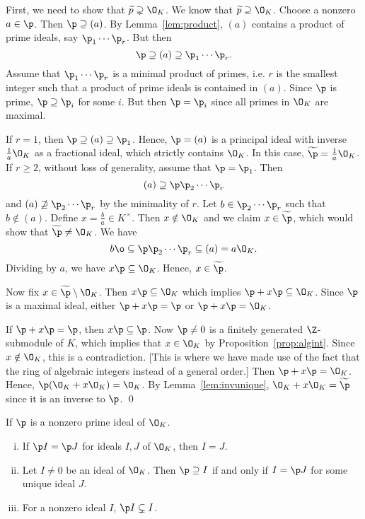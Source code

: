 \pf First, we need to show that $\widetilde{p} \supsetneq \O_K$. We know that $\widetilde{p} \supseteq \O_K$. Choose a nonzero $a \in \p$. Then $\p \supseteq (a)$. By Lemma~\ref{lem:product}, $(a)$ contains a product of prime ideals, say $\p_1\cdots\p_r$. But then
	\[
	\p \supseteq (a) \supseteq \p_1 \cdots \p_r.
	\]
Assume that $\p_1\cdots\p_r$ is a minimal product of primes, i.e. $r$ is the smallest integer such that a product of prime ideals is contained in $(a)$. Since $\p$ is prime, $\p \supseteq \p_i$ for some $i$. But then $\p=\p_i$ since all primes in $\O_K$ are maximal. 

If $r=1$, then $\p \supseteq (a) \supseteq \p_1$. Hence, $\p=(a)$ is a principal ideal with inverse $\frac{1}{a} \O_K$ as a fractional ideal, which strictly contains $\O_K$. In this case, $\widetilde{\p}=\frac{1}{a} \O_K$. If $r \geq 2$, without loss of generality, assume that $\p=\p_1$. Then
	\[
	(a) \supseteq \p \p_2 \cdots \p_r
	\]
and $(a) \not\supseteq \p_2 \cdots \p_r$ by the minimality of $r$. Let $b \in \p_2 \cdots \p_r$ such that $b \notin (a)$. Define $x=\frac{b}{a} \in K^\times$. Then $x \notin \O_K$ and we claim $x \in \widetilde{\p}$, which would show that $\widetilde{\p} \neq \O_K$. We have
	\[
	b \o \subseteq \p \p_2 \cdots \p_r \subseteq (a)= a\O_K.
	\]
Dividing by $a$, we have $x\p \subseteq \O_K$. Hence, $x \in \widetilde{\p}$. 

Now fix $x \in \widetilde{\p} \setminus \O_K$. Then $x\p \subseteq \O_K$ which implies $\p + x\p \subseteq \O_K$. Since $\p$ is a maximal ideal, either $\p+x\p=\p$ or $\p+x\p=\O_K$. 

If $\p+x\p=\p$, then $x\p \subseteq \p$. Now $\p \neq 0$ is a finitely generated $\Z$-submodule of $K$, which implies that $x \in \O_K$ by Proposition~\ref{prop:algint}. Since $x \notin \O_K$, this is a contradiction. [This is where we have made use of the fact that the ring of algebraic integers instead of a general order.] Then $\p+x\p=\O_K$. Hence, $\p(\O_K + x\O_K)=\O_K$. By Lemma~\ref{lem:invunique}, $\O_K+x\O_K=\widetilde{\p}$ since it is an inverse to $\p$. \qed \\


\begin{cor}
If $\p$ is a nonzero prime ideal of $\O_K$.
\begin{enumerate}[(i)]
\item If $\p I=\p J$ for ideals $I,J$ of $\O_K$, then $I=J$.
\item Let $I \neq 0$ be an ideal of $\O_K$. Then $\p \supseteq I$ if and only if $I=\p J$ for some unique ideal $J$.
\item For a nonzero ideal $I$, $\p I \subsetneq I$. 
\end{enumerate}
\end{cor}

